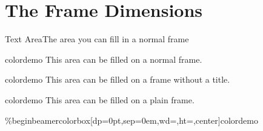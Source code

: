 \documentclass[final]{beamer}
\begin{document}
\section{The Frame Dimensions}
%
%
%
%
\begin{frame}[t]{Text Area}{The area you can fill in a normal frame}

\begin{beamercolorbox}[dp=0pt,sep=0em,wd=\textwidth,ht=\FrameHeight,center]{colordemo}%
This area can be filled on a normal frame.
\vspace{5cm}%
\end{beamercolorbox}%
\end{frame}
%
%
%
\begin{frame}

\begin{beamercolorbox}[dp=0pt,sep=0em,
					   wd=\textwidth,
					   ht=\dimexpr\FrameHeight+\TitleHeight+4mm,center]{colordemo}%
This area can be filled on a frame without a title.
\vspace{5cm}%
\end{beamercolorbox}%
\end{frame}
%
%
%
%
%
\begin{frame}[plain]
\begin{beamercolorbox}[dp=0pt,sep=0em,wd=\textwidth,ht=\paperheight,center]{colordemo}%
This area can be filled on a plain frame.
\vspace{5cm}%
\end{beamercolorbox}%
\end{frame}
%
%
%
%
%
\%begin{beamercolorbox}[dp=0pt,sep=0em,wd=\textwidth,ht=\paperheight,center]{colordemo}%
%
%
%
%
%
\end{document}
